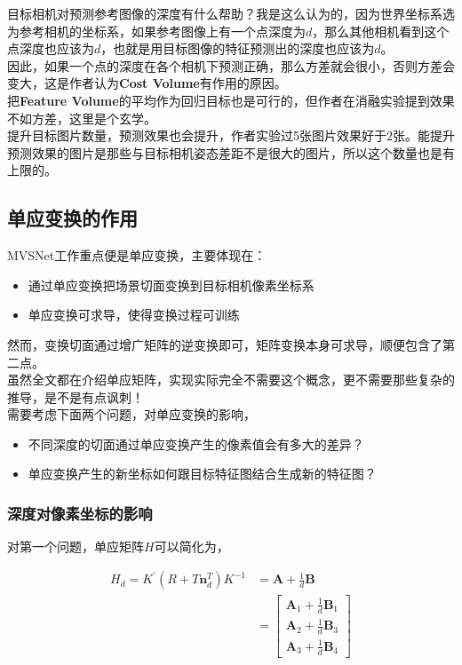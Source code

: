 	目标相机对预测参考图像的深度有什么帮助？我是这么认为的，因为世界坐标系选为参考相机的坐标系，如果参考图像上有一个点深度为$d$，那么其他相机看到这个点深度也应该为$d$，也就是用目标图像的特征预测出的深度也应该为$d$。\\

	因此，如果一个点的深度在各个相机下预测正确，那么方差就会很小，否则方差会变大，这是作者认为\textbf{Cost Volume}有作用的原因。\\

	把\textbf{Feature Volume}的平均作为回归目标也是可行的，但作者在消融实验提到效果不如方差，这里是个玄学。\\

	提升目标图片数量，预测效果也会提升，作者实验过5张图片效果好于2张。能提升预测效果的图片是那些与目标相机姿态差距不是很大的图片，所以这个数量也是有上限的。

\subsection{单应变换的作用}
	MVSNet工作重点便是单应变换，主要体现在：
	\begin{itemize}
		\item 通过单应变换把场景切面变换到目标相机像素坐标系
		\item 单应变换可求导，使得变换过程可训练
	\end{itemize}

	然而，变换切面通过增广矩阵的逆变换即可，矩阵变换本身可求导，顺便包含了第二点。\\

	虽然全文都在介绍单应矩阵，实现实际完全不需要这个概念，更不需要那些复杂的推导，是不是有点讽刺！\\

	需要考虑下面两个问题，对单应变换的影响，
	\begin{itemize}
		\item 不同深度的切面通过单应变换产生的像素值会有多大的差异？
		\item 单应变换产生的新坐标如何跟目标特征图结合生成新的特征图？
	\end{itemize}

	\subsubsection*{深度对像素坐标的影响}
	对第一个问题，单应矩阵$H$可以简化为，

	\begin{align*}
		H_d= K^{\prime}\left(R + T\mathbf{n}_d^T\right)K^{-1} &= \mathbf{A} +\frac{1}{d}\mathbf{B}\\
		&= \begin{bmatrix}
			\mathbf{A}_1 + \frac{1}{d}\mathbf{B}_1\\
			\mathbf{A}_2 + \frac{1}{d}\mathbf{B}_3\\
			\mathbf{A}_3 + \frac{1}{d}\mathbf{B}_4
		\end{bmatrix}
	\end{align*}

